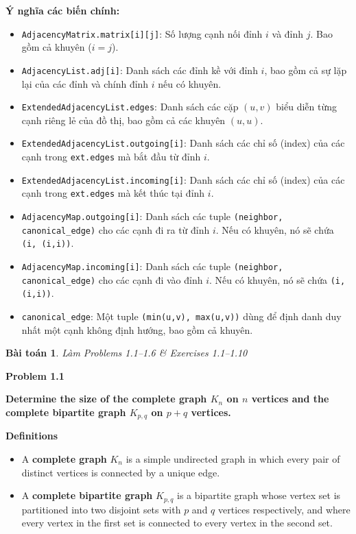 \documentclass{article}
\newtheorem{baitoan}{Bài toán}
\begin{document}
\textbf{Ý nghĩa các biến chính:}

\begin{itemize}
    \item \texttt{AdjacencyMatrix.matrix[i][j]}: Số lượng cạnh nối đỉnh $i$ và đỉnh $j$. Bao gồm cả khuyên ($i=j$).
    \item \texttt{AdjacencyList.adj[i]}: Danh sách các đỉnh kề với đỉnh $i$, bao gồm cả sự lặp lại của các đỉnh và chính đỉnh $i$ nếu có khuyên.
    \item \texttt{ExtendedAdjacencyList.edges}: Danh sách các cặp $(u,v)$ biểu diễn từng cạnh riêng lẻ của đồ thị, bao gồm cả các khuyên $(u,u)$.
    \item \texttt{ExtendedAdjacencyList.outgoing[i]}: Danh sách các chỉ số (index) của các cạnh trong \texttt{ext.edges} mà bắt đầu từ đỉnh $i$.
    \item \texttt{ExtendedAdjacencyList.incoming[i]}: Danh sách các chỉ số (index) của các cạnh trong \texttt{ext.edges} mà kết thúc tại đỉnh $i$.
    \item \texttt{AdjacencyMap.outgoing[i]}: Danh sách các tuple \texttt{(neighbor, canonical\_edge)} cho các cạnh đi ra từ đỉnh $i$. Nếu có khuyên, nó sẽ chứa \texttt{(i, (i,i))}.
    \item \texttt{AdjacencyMap.incoming[i]}: Danh sách các tuple \texttt{(neighbor, canonical\_edge)} cho các cạnh đi vào đỉnh $i$. Nếu có khuyên, nó sẽ chứa \texttt{(i, (i,i))}.
    \item \texttt{canonical\_edge}: Một tuple \texttt{(min(u,v), max(u,v))} dùng để định danh duy nhất một cạnh không định hướng, bao gồm cả khuyên.
\end{itemize}



\begin{baitoan}
    Làm Problems 1.1--1.6 \& Exercises 1.1--1.10
\end{baitoan}

\textbf{Problem 1.1}

\textbf{Determine the size of the complete graph $K_n$ on $n$ vertices and the complete bipartite graph $K_{p,q}$ on $p + q$ vertices.}

\textbf{Definitions}

\begin{itemize}
    \item A \textbf{complete graph} $K_n$ is a simple undirected graph in which every pair of distinct vertices is connected by a unique edge.
    \item A \textbf{complete bipartite graph} $K_{p,q}$ is a bipartite graph whose vertex set is partitioned into two disjoint sets with $p$ and $q$ vertices respectively, and where every vertex in the first set is connected to every vertex in the second set.
\end{itemize}
\end{document}
